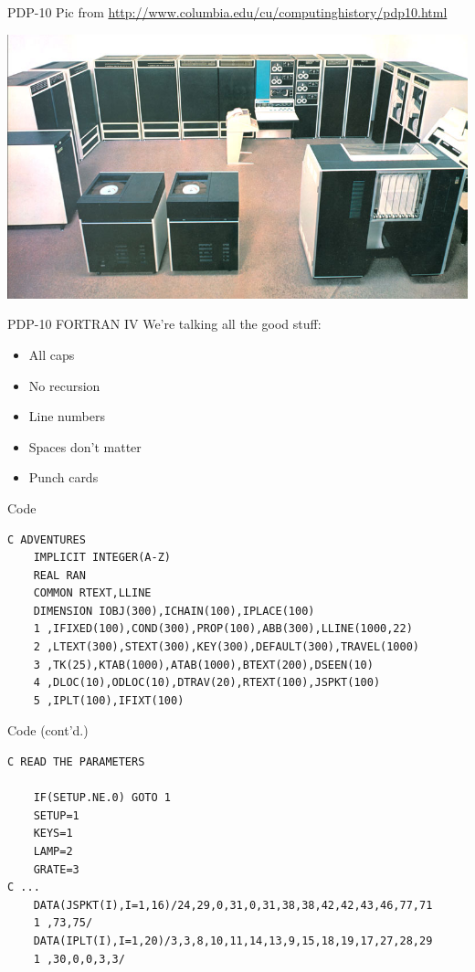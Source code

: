 \documentclass{beamer}
\def\fortran{
  \lstset{
     language=[77]FORTRAN,
     keywordstyle=\bfseries,
     extendedchars=true,
     basicstyle=\footnotesize\ttfamily,
     showstringspaces=false,
     showspaces=false,
     numbersep=9pt,
     tabsize=8,
     breaklines=true,
     showtabs=false,
     captionpos=b
  }
}
\begin{document}
\begin{frame}{PDP-10}
Pic from \url{http://www.columbia.edu/cu/computinghistory/pdp10.html}

\begin{center}
  \includegraphics[width=.75\textwidth]{ka10.jpg}
\end{center}
\end{frame}
\begin{frame}{PDP-10 FORTRAN IV}
  We're talking all the good stuff:

\begin{itemize}
  \item All caps
  \item No recursion
  \item Line numbers
  \item Spaces don't matter
  \item Punch cards
\end{itemize}

\end{frame}
\begin{frame}[fragile]{Code}

\fortran
\begin{lstlisting}
C ADVENTURES
	IMPLICIT INTEGER(A-Z)
	REAL RAN
	COMMON RTEXT,LLINE
	DIMENSION IOBJ(300),ICHAIN(100),IPLACE(100)
	1 ,IFIXED(100),COND(300),PROP(100),ABB(300),LLINE(1000,22)
	2 ,LTEXT(300),STEXT(300),KEY(300),DEFAULT(300),TRAVEL(1000)
	3 ,TK(25),KTAB(1000),ATAB(1000),BTEXT(200),DSEEN(10)
	4 ,DLOC(10),ODLOC(10),DTRAV(20),RTEXT(100),JSPKT(100)
	5 ,IPLT(100),IFIXT(100)
\end{lstlisting}

\end{frame}

\begin{frame}[fragile]{Code (cont'd.)}

\fortran
\begin{lstlisting}
C READ THE PARAMETERS

	IF(SETUP.NE.0) GOTO 1
	SETUP=1
	KEYS=1
	LAMP=2
	GRATE=3
C ...
	DATA(JSPKT(I),I=1,16)/24,29,0,31,0,31,38,38,42,42,43,46,77,71
	1 ,73,75/
	DATA(IPLT(I),I=1,20)/3,3,8,10,11,14,13,9,15,18,19,17,27,28,29
	1 ,30,0,0,3,3/
\end{lstlisting}
\end{frame}
\end{document}
